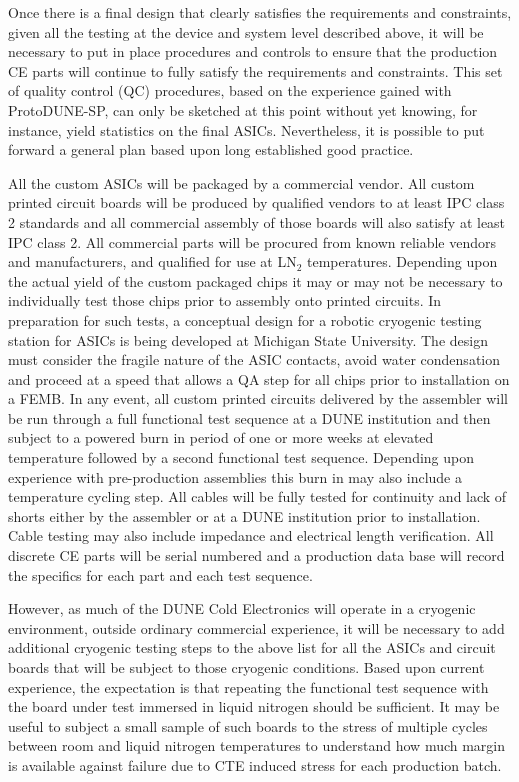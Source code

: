 Once there is a final design that clearly satisfies the requirements and constraints, given all the testing at the device and system level described above, it will be necessary to put in place procedures and controls to ensure that the production CE parts will continue to fully satisfy the requirements and constraints. This set of quality control (QC) procedures, based on the experience gained with ProtoDUNE-SP, can only be sketched at this point without yet knowing, for instance, yield statistics on the final ASICs. Nevertheless, it is possible to put forward a general plan based upon long established good practice.

All the custom ASICs will be packaged by a commercial vendor. All custom printed circuit boards will be produced by qualified vendors to at least IPC class 2 standards and all commercial assembly of those boards will also satisfy at least IPC class 2. All commercial parts will be procured from known reliable vendors and manufacturers, and qualified for use at LN$_2$ temperatures. Depending upon the actual yield of the custom packaged chips it may or may not be necessary to individually test those chips prior to assembly onto printed circuits. In preparation for such tests, a conceptual design for a robotic cryogenic testing station for ASICs is being developed at Michigan State University. The design must consider the fragile nature of the ASIC contacts, avoid water condensation and proceed at a speed that allows a QA step for all chips prior to installation on a FEMB. In any event, all custom printed circuits delivered by the assembler will be run through a full functional test sequence at a DUNE institution and then subject to a powered burn in period of one or more weeks at elevated temperature followed by a second functional test sequence. Depending upon experience with pre-production assemblies this burn in may also include a temperature cycling step. All cables will be fully tested for continuity and lack of shorts either by the assembler or at a DUNE institution prior to installation. Cable testing may also include impedance and electrical length verification. All discrete CE parts will be serial numbered and a production data base will record the specifics for each part and each test sequence.

However, as much of the DUNE Cold Electronics will operate in a cryogenic environment, outside ordinary commercial experience, it will be necessary to add additional cryogenic testing steps to the above list for all the ASICs and circuit boards that will be subject to those cryogenic conditions. Based upon current experience, the expectation is that repeating the functional test sequence with the board under test immersed in liquid nitrogen should be sufficient. It may be useful to subject a small sample of such boards to the stress of multiple cycles between room and liquid nitrogen temperatures to understand how much margin is available against failure due to CTE induced stress for each production batch.

